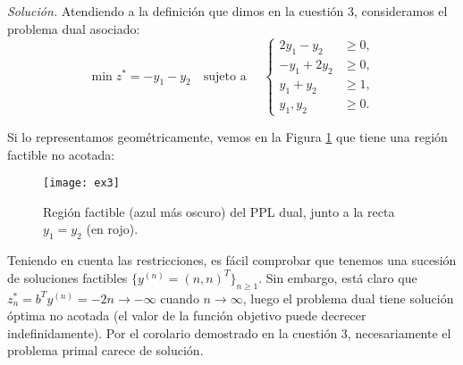 \documentclass[11pt,a4paper]{article}
\begin{document}
\textit{Solución.} Atendiendo a la definición que dimos en la cuestión 3, consideramos el problema dual asociado:
\[
\min z^\ast=-y_1-y_2 \quad \text{sujeto a } \quad \begin{cases}
  2y_1-y_2&\geq 0,\\
  -y_1+2y_2&\geq 0,\\
   y_1+y_2&\geq 1,\\
  y_1, y_2 &\geq 0.
\end{cases}
\]

Si lo representamos geométricamente, vemos en la Figura \ref{fig:2} que tiene una región factible no acotada:

\begin{figure}[h!]
  \centering
  \texttt{[image: ex3]}
  \caption{Región factible (azul más oscuro) del PPL dual, junto a la recta $y_1=y_2$ (en rojo).}
  \label{fig:2}
\end{figure}



Teniendo en cuenta las restricciones, es fácil comprobar que tenemos una sucesión de soluciones factibles $\{y^{(n)}=(n, n)^T\}_{n\geq 1}$. Sin embargo, está claro que $z_n^\ast=b^Ty^{(n)} = -2n\to-\infty$ cuando $n\to\infty$, luego el problema dual tiene solución óptima no acotada (el valor de la función objetivo puede decrecer indefinidamente). Por el corolario demostrado en la cuestión 3, necesariamente el problema primal carece de solución.
\end{document}
